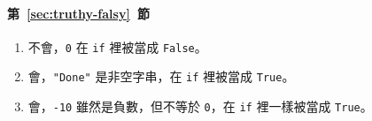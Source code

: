 \paragraph{第~\ref{sec:truthy-falsy}~節}
\begin{enumerate}
\item 不會，\texttt{0} 在 \texttt{if} 裡被當成 \texttt{False}。
\item 會，\texttt{"Done"} 是非空字串，在 \texttt{if} 裡被當成 \texttt{True}。
\item 會，\texttt{-10} 雖然是負數，但不等於 \texttt{0}，在 \texttt{if} 裡一樣被當成
\texttt{True}。
\end{enumerate}
